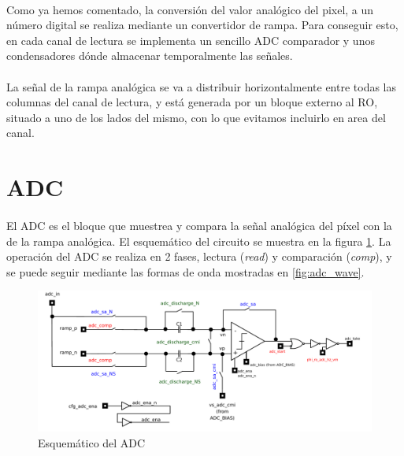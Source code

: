 \paragraph{}
Como ya hemos comentado, la conversión del valor analógico del pixel, a un número
digital se realiza mediante un convertidor de rampa. Para conseguir esto,
en cada canal de lectura se implementa un sencillo ADC comparador y unos condensadores
dónde almacenar temporalmente las señales.

\paragraph{}
La señal de la rampa analógica se va a distribuir horizontalmente entre todas las
columnas del canal de lectura, y está generada por un bloque externo al RO, situado
a uno de los lados del mismo, con lo que evitamos incluirlo en area del canal.


\section{ADC}\label{cap:ro_sch_adc}

\paragraph{}
El ADC es el bloque que muestrea y compara la señal analógica del píxel con la de la
rampa analógica. El esquemático del circuito se muestra en la figura \ref{fig:adc_sch}.
La operación del ADC se realiza en 2 fases, lectura (\textit{read}) y comparación
(\textit{comp}), y se puede seguir mediante las formas de onda mostradas en \ref{fig:adc_wave}.

\begin{figure}[h]
	\includegraphics[width=\textwidth]{svg/adc_sch.pdf}
	\caption{Esquemático del ADC}
	\label{fig:adc_sch}
\end{figure}

